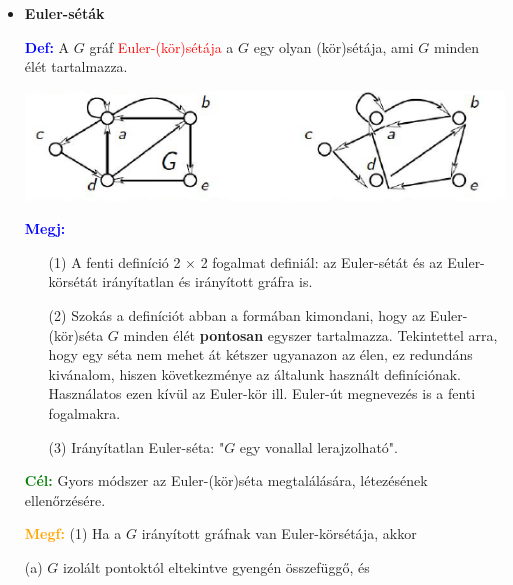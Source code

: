 \documentclass[../../szobeli.tex]{subfiles}
\begin{document}
\begin{center}
    \noindent{}
\end{center}

    \begin{itemize}
        \item \textbf{Euler-séták}

        \textcolor{blue}{\textbf{Def:}} A $G$ gráf \textcolor{red}{Euler-(kör)sétája} a $G$ egy olyan (kör)sétája, ami $G$ minden élét tartalmazza.

        \includegraphics[width=\textwidth]{img/1.png}

        \textcolor{blue}{\textbf{Megj:}} \begin{itemize}
            \item[(1)] A fenti definíció 2 $\times$ 2 fogalmat definiál: az Euler-sétát és az Euler-körsétát irányítatlan és irányított gráfra is. 
            \item[(2)] Szokás a definíciót abban a formában kimondani, hogy az Euler-(kör)séta $G$ minden élét \textbf{pontosan} egyszer tartalmazza. Tekintettel arra, hogy egy séta nem mehet át kétszer ugyanazon az élen, ez redundáns kivánalom, hiszen következménye az általunk használt definíciónak. Használatos ezen kívül az Euler-kör ill. Euler-út megnevezés is a fenti fogalmakra. 
            \item[(3)] Irányítatlan Euler-séta: "$G$ egy vonallal lerajzolható".
        \end{itemize}

        \textcolor{green}{\textbf{Cél:}} Gyors módszer az Euler-(kör)séta megtalálására, létezésének ellenőrzésére.

        \textcolor{orange}{\textbf{Megf:}} (1) Ha a $G$ irányított gráfnak van Euler-körsétája, akkor 

            (a) $G$ izolált pontoktól eltekintve gyengén összefüggő, és 


\end{itemize}
\end{document}
